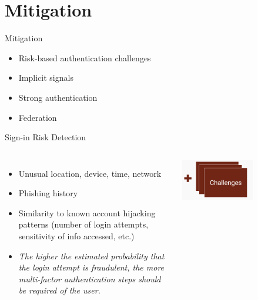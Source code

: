 \documentclass[nobackground,dvipsnames,table,aspectratio=169]{beamer}
\begin{document}
\section{Mitigation}

\begin{frame}{Mitigation}
    \Large
    \begin{itemize}
        \item Risk-based authentication challenges
        \item Implicit signals
        \item Strong authentication
        \item Federation
    \end{itemize}
\end{frame}

\begin{frame}{Sign-in Risk Detection}
    \begin{columns}
            \small
            \begin{itemize}
                \item Unusual location, device, time, network 
                \item Phishing history
                \item Similarity to known account hijacking patterns (number of login attempts, sensitivity of info accessed, etc.)
                \item \textit{The higher the estimated probability that the login attempt is fraudulent, the more multi-factor authentication steps should be required of the user.}
            \end{itemize}
            \centering
            \includegraphics[width=0.6\textwidth]{challenges}

\end{columns}
\end{frame}
\end{document}

